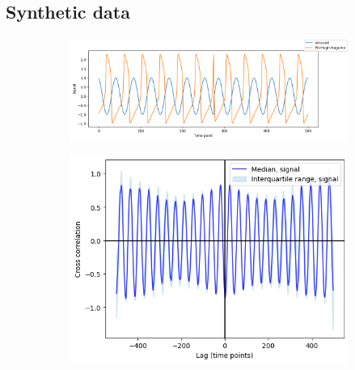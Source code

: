 \subsection{Synthetic data}
\label{subsubsec:analysis-correlation-synthetic}

\begin{figure}
  \centering
  \begin{subfigure}[t]{0.6\textwidth}
  \centering
    \includegraphics[width=\linewidth]{sinusoid_and_fitzhughnagumo_nonoise.png}
    \caption{
    }
    \label{fig:xcf-nonoise-ts}
  \end{subfigure}%
  \centering
  \begin{subfigure}[t]{0.4\textwidth}
  \centering
    \includegraphics[width=\linewidth]{randomshift_sinusoid_fitzhughnagumo_xcf.png}
    \caption{
    }
    \label{fig:xcf-nonoise-xcf}
  \end{subfigure}


\end{figure}
